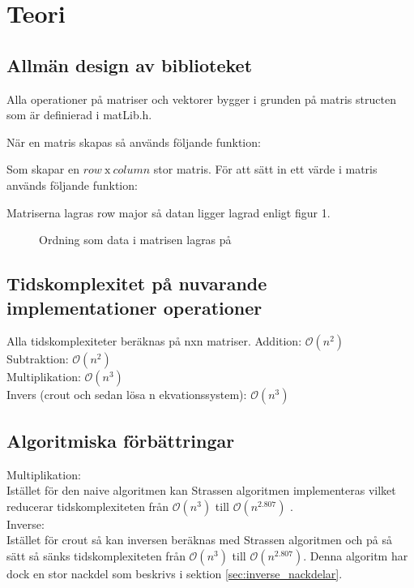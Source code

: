 \section{Teori}

\subsection{Allmän design av biblioteket}
Alla operationer på matriser och vektorer bygger i grunden på matris structen som är definierad i matLib.h.

När en matris skapas så används följande funktion:

Som skapar en $row \ \text{x} \ column$ stor matris.
\newline
\newline
För att sätt in ett värde i matris används följande funktion:

Matriserna lagras row major så datan ligger lagrad enligt figur 1. 
\begin{figure}[h]
\center
\scalebox{0.8}{}
\caption{Ordning som data i matrisen lagras på}
\end{figure}


\subsection{Tidskomplexitet på nuvarande implementationer operationer}
Alla tidskomplexiteter beräknas på nxn matriser.
Addition: $\mathcal{O}(n^2)$\\
Subtraktion: $\mathcal{O}(n^2)$\\
Multiplikation: $\mathcal{O}(n^3)$\\
Invers (crout och sedan lösa n ekvationssystem): $\mathcal{O}(n^3)$\\ 

\subsection{Algoritmiska förbättringar}
Multiplikation:\\
Istället för den naive algoritmen kan Strassen algoritmen implementeras vilket reducerar tidskomplexiteten från $\mathcal{O}(n^3)$ till $\mathcal{O}(n^{2.807})$ \cite{Strassen1969}. \\
Inverse:\\
Istället för crout så kan inversen beräknas med Strassen algoritmen och på så sätt så sänks tidskomplexiteten från $\mathcal{O}(n^3)$ till $\mathcal{O}(n^{2.807})$. Denna algoritm har dock en stor nackdel som beskrivs i sektion \ref{sec:inverse_nackdelar}.

